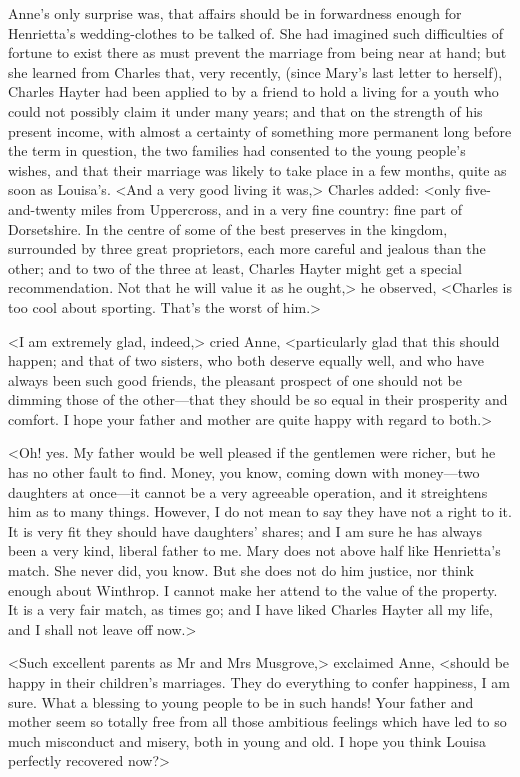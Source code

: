 Anne's only surprise was, that affairs should be in forwardness enough for Henrietta's wedding-clothes to be talked of. She had imagined such difficulties of fortune to exist there as must prevent the marriage from being near at hand; but she learned from Charles that, very recently, (since Mary's last letter to herself), Charles Hayter had been applied to by a friend to hold a living for a youth who could not possibly claim it under many years; and that on the strength of his present income, with almost a certainty of something more permanent long before the term in question, the two families had consented to the young people's wishes, and that their marriage was likely to take place in a few months, quite as soon as Louisa's. <And a very good living it was,> Charles added: <only five-and-twenty miles from Uppercross, and in a very fine country: fine part of Dorsetshire. In the centre of some of the best preserves in the kingdom, surrounded by three great proprietors, each more careful and jealous than the other; and to two of the three at least, Charles Hayter might get a special recommendation. Not that he will value it as he ought,> he observed, <Charles is too cool about sporting. That's the worst of him.>

<I am extremely glad, indeed,> cried Anne, <particularly glad that this should happen; and that of two sisters, who both deserve equally well, and who have always been such good friends, the pleasant prospect of one should not be dimming those of the other—that they should be so equal in their prosperity and comfort. I hope your father and mother are quite happy with regard to both.>

<Oh! yes. My father would be well pleased if the gentlemen were richer, but he has no other fault to find. Money, you know, coming down with money—two daughters at once—it cannot be a very agreeable operation, and it streightens him as to many things. However, I do not mean to say they have not a right to it. It is very fit they should have daughters' shares; and I am sure he has always been a very kind, liberal father to me. Mary does not above half like Henrietta's match. She never did, you know. But she does not do him justice, nor think enough about Winthrop. I cannot make her attend to the value of the property. It is a very fair match, as times go; and I have liked Charles Hayter all my life, and I shall not leave off now.>

<Such excellent parents as Mr and Mrs Musgrove,> exclaimed Anne, <should be happy in their children's marriages. They do everything to confer happiness, I am sure. What a blessing to young people to be in such hands! Your father and mother seem so totally free from all those ambitious feelings which have led to so much misconduct and misery, both in young and old. I hope you think Louisa perfectly recovered now?>

